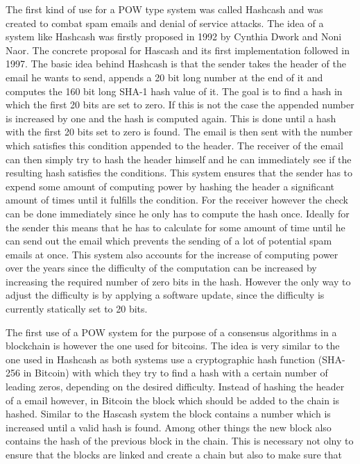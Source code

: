 The first kind of use for a POW type system was called Hashcash\cite{url:hashcash} and was created to combat spam emails and denial of service attacks. The idea of a system like Hashcash was firstly proposed in 1992
by Cynthia Dwork and Noni Naor.\cite{url:pow_email} The concrete proposal for Hascash and its first implementation followed in 1997.\cite{url:hashcash} The basic idea behind Hashcash is that
the sender takes the header of the email he wants to send, appends a 20 bit long number at the end of it and computes the 160 bit long SHA-1 hash value of it. The goal is to find a hash in which the first 20 bits
are set to zero. If this is not the case the appended number is increased by one and the hash is computed again. This is done until a hash with the first 20 bits set to zero is found. The email
is then sent with the number which satisfies this condition appended to the header. The receiver of the email can then simply try to hash the header himself and he can immediately see if the resulting
hash satisfies the conditions. This system ensures that the sender has to expend some amount of computing power by hashing the header a significant amount of times until it fulfills the condition.
For the receiver however the check can be done immediately since he only has to compute the hash once. Ideally for the sender this means that he has to calculate for some amount of time until
he can send out the email which prevents the sending of a lot of potential spam emails at once. This system also accounts for the increase of computing power over the years since the difficulty of
the computation can be increased by increasing the required number of zero bits in the hash. However the only way to adjust the difficulty is by applying a software update, since the difficulty
is currently statically set to 20 bits.\par
The first use of a POW system for the purpose of a consensus algorithms in a blockchain is however the one used for bitcoins. The idea is very similar to the one used in Hashcash as both systems use a
cryptographic hash function (SHA-256 in Bitcoin) with which they try to find a hash with a certain number of leading zeros, depending on the desired difficulty. Instead of hashing the header of a email
however, in Bitcoin the block which should be added to the chain is hashed. Similar to the Hascash system the block contains a number which is increased until a valid hash is found.
Among other things the new block also contains the hash of the previous block in the chain. This is necessary not olny to ensure that the blocks are linked and create a chain but also to make sure that
